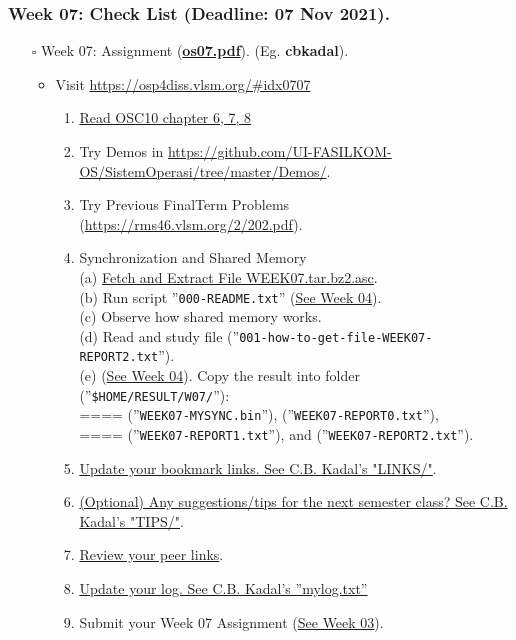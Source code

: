 \begin{frame}
\frametitle{Week 07: Check List (Deadline: 07 Nov 2021).}
\begin{itemize}
\item [$\square$] Week 07: Assignment (\href{https://os.vlsm.org/Slides/os07.pdf}{\textbf{os07.pdf}}).
(Eg. \textbf{cbkadal}).
\begin{itemize}
\item Visit \url{https://osp4diss.vlsm.org/\#idx0707}
\begin{enumerate}
\item \href{https://www.os-book.com/OS10/slide-dir/}{Read OSC10 chapter 6, 7, 8}
\item Try Demos in {\tiny \url{https://github.com/UI-FASILKOM-OS/SistemOperasi/tree/master/Demos/}}.
\item Try Previous FinalTerm Problems {\tiny (\url{https://rms46.vlsm.org/2/202.pdf})}.
\item Synchronization and Shared Memory\\
(a) \href{https://os.vlsm.org/WEEK/WEEK07.tar.bz2.asc}{Fetch and Extract File WEEK07.tar.bz2.asc}.\\
(b) Run script ''\texttt{000-README.txt}'' (\href{https://osp4diss.vlsm.org/W04-01.html}{See Week 04}).\\
(c) Observe how shared memory works.\\
(d) Read and study file {\scriptsize (''\texttt{001-how-to-get-file-WEEK07-REPORT2.txt}'')}.\\
(e) (\href{https://osp4diss.vlsm.org/W04-03.html}{See Week 04}). 
Copy the result into folder {\scriptsize (''\texttt{\$HOME/RESULT/W07/}'')}:\\
==== (''\texttt{WEEK07-MYSYNC.bin}''), (''\texttt{WEEK07-REPORT0.txt}''), \\
==== (''\texttt{WEEK07-REPORT1.txt}''), and (''\texttt{WEEK07-REPORT2.txt}'').\\
\item \href{https://cbkadal.github.io/os212/LINKS/}{Update your bookmark links. See C.B. Kadal's "LINKS/"}.
\item \href{https://cbkadal.github.io/os212/TIPS/}{(Optional) Any suggestions/tips for the next semester class? See C.B. Kadal's "TIPS/"}.
\item \href{https://osp4diss.vlsm.org/W02-05.html}{Review your peer links}.
\item \href{https://cbkadal.github.io/os212/TXT/mylog.txt}{Update your log. See C.B. Kadal's ''mylog.txt''}
\item Submit your Week 07 Assignment (\href{https://osp4diss.vlsm.org/W03-06.html}{See Week 03}).
\end{enumerate}
\end{itemize}
\end{itemize}

\end{frame}
